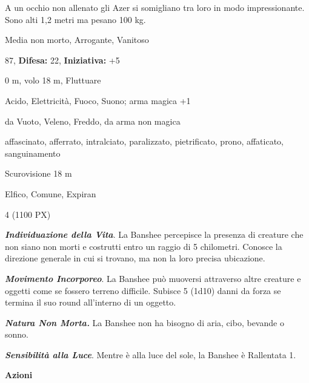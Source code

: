 \begin{multicols}{2}
{A un occhio non allenato gli Azer si somigliano tra loro in modo impressionante. Sono alti 1,2 metri ma pesano 100 kg.


\begin{description}[noitemsep, topsep=0pt, parsep=0pt, partopsep=0pt, leftmargin=0cm, labelwidth=2.2cm]
	\item[\textbf{Taglia/Tipo:}] Media non morto, Arrogante, Vanitoso
	\item[\textbf{Caratt.:}] 
	\item[\textbf{Punti Ferita:}] 87,  \textbf{Difesa:} 22,  \textbf{Iniziativa:} +5
	\item[\textbf{Movimento:}] 0 m, volo 18 m, Fluttuare
	\item[\textbf{Tiri Salvez.:}] 
	\item[\textbf{Res. Danni:}] Acido, Elettricità, Fuoco, Suono; arma magica +1
	\item[\textbf{Imm. Danni:}] da Vuoto, Veleno, Freddo, da arma non magica
	\item[\textbf{Immunità:}] affascinato, afferrato, intralciato, paralizzato, pietrificato, prono, affaticato, sanguinamento
	\item[\textbf{Sensi:}] Scurovisione 18 m
	\item[\textbf{Linguaggi:}] Elfico, Comune, Expiran
	\item[\textbf{Sfida:}] 4 (1100 PX)\smallskip
\end{description}

\emph{\textbf{Individuazione della Vita}}. La Banshee percepisce la presenza di creature che non siano non morti e costrutti entro un raggio di 5 chilometri. Conosce la direzione generale in cui si trovano, ma non la loro precisa ubicazione.

\emph{\textbf{Movimento Incorporeo}}. La Banshee può muoversi attraverso altre creature e oggetti come se fossero terreno difficile. Subisce 5 (1d10) danni da forza se termina il suo round all'interno di un oggetto.

\emph{\textbf{Natura Non Morta.}} La Banshee non ha bisogno di aria, cibo, bevande o sonno.

\emph{\textbf{Sensibilità alla Luce}}. Mentre è alla luce del sole, la Banshee è Rallentata 1.

\textbf{Azioni}

}
\end{multicols}
